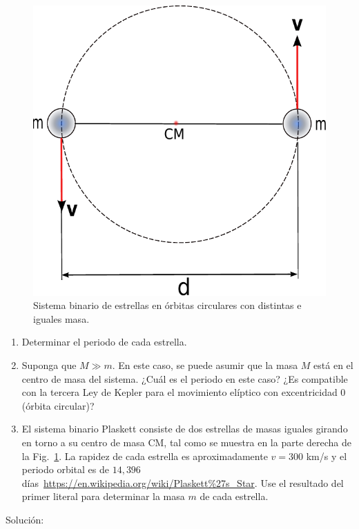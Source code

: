 \begin{enumerate}
\begin{figure}[h]
\begin{center}
\includegraphics[scale=0.6]{gravitacion/sistema-binario-mm}
\end{center}
\caption{Sistema binario de estrellas en órbitas circulares con distintas e iguales masa.}
\label{fig:sistema-binario-Mm}
\end{figure}
%
\begin{enumerate}
\item Determinar el periodo de cada estrella.
\item Suponga que $M\gg m$. En este caso, se puede asumir que la masa $M$ está en el centro de masa del sistema. 
¿Cuál es el periodo en este caso? ¿Es compatible con la tercera Ley de Kepler para el movimiento elíptico con excentricidad 0 (órbita circular)?
%
\item El sistema binario Plaskett consiste de dos estrellas de masas iguales girando en torno a su centro de masa CM, tal como se muestra en la parte derecha de la Fig.~\ref{fig:sistema-binario-Mm}. 
La rapidez de cada estrella es aproximadamente $v = 300$ km/s y el periodo orbital es de $14,396$ días~\url{https://en.wikipedia.org/wiki/Plaskett%27s_Star}. 
Use el resultado del primer literal para determinar la masa $m$ de cada estrella.
\end{enumerate}

Solución:
\begin{enumerate}


\end{enumerate}
\end{enumerate}
